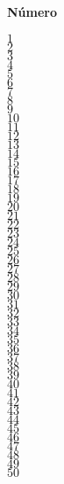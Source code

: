 \documentclass[a4paper,10pt]{article}
\begin{document}
\begin{multicols}{3}	

\begin{center} {\bf N\'umero} \end{center}
$1$\\
$2$\\
$3$\\
$4$\\
$5$\\
$6$\\
$7$\\
$8$\\
$9$\\
$10$\\
$11$\\
$12$\\
$13$\\
$14$\\
$15$\\
$16$\\
$17$\\
$18$\\
$19$\\
$20$\\
$21$\\
$22$\\
$23$\\
$24$\\
$25$\\
$26$\\
$27$\\
$28$\\
$29$\\
$30$\\
$31$\\
$32$\\
$33$\\
$34$\\
$35$\\
$36$\\
$37$\\
$38$\\
$39$\\
$40$\\
$41$\\
$42$\\
$43$\\
$44$\\
$45$\\
$46$\\
$47$\\
$48$\\
$49$\\
$50$\\


\end{multicols}
\end{document}
